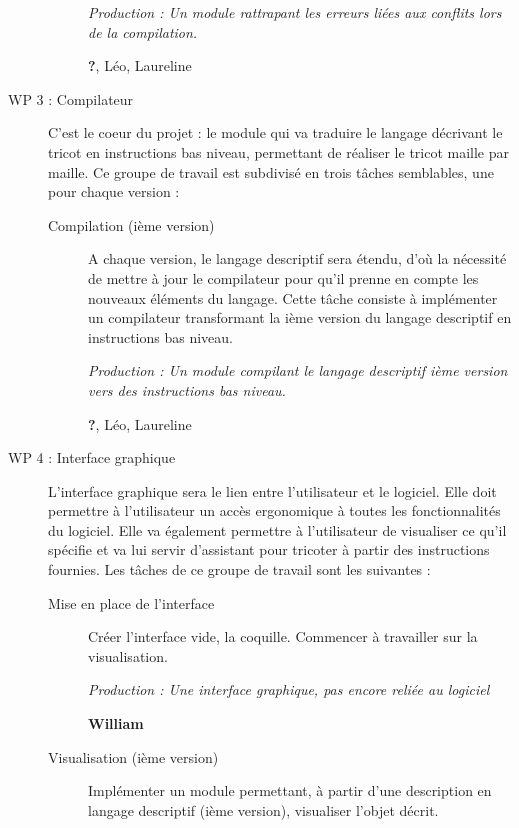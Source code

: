 \documentclass{article}
\begin{document}
\begin{description}
\begin{description}
      \textit{Production : Un module rattrapant les erreurs liées aux conflits lors de la compilation.}

      \textbf{?}, Léo, Laureline

    \end{description}

\medskip

\item[WP 3 : Compilateur] C'est le coeur du projet : le module qui va traduire le langage décrivant le tricot en instructions 
bas niveau, permettant de réaliser le tricot maille par maille. Ce groupe de travail est subdivisé en trois tâches semblables, une pour 
chaque version :

    \begin{description}
    \item[Compilation (ième version)] A chaque version, le langage descriptif sera étendu, d'où la nécessité de mettre à jour le 
compilateur pour qu'il prenne en compte les nouveaux éléments du langage. Cette tâche consiste à implémenter un compilateur transformant 
la ième version du langage descriptif en instructions bas niveau.

      \textit{Production : Un module compilant le langage descriptif ième version vers des instructions bas niveau.}

      \textbf{?}, Léo, Laureline %
    \end{description}

\medskip

\item[WP 4 : Interface graphique] L'interface graphique sera le lien entre l'utilisateur et le logiciel. Elle doit permettre à 
l'utilisateur un accès ergonomique à toutes les fonctionnalités du logiciel. Elle va également permettre à l'utilisateur de visualiser ce 
qu'il spécifie et va lui servir d'assistant pour tricoter à partir des instructions fournies. Les tâches de ce groupe de travail sont les 
suivantes :

  \begin{description}
  \item[Mise en place de l'interface] Créer l'interface vide, la coquille. Commencer à travailler sur la visualisation.

    \textit{Production : Une interface graphique, pas encore reliée au logiciel}

    \textbf{William}
	
  \item[Visualisation (ième version)] Implémenter un module permettant, à partir d'une description en langage descriptif (ième version), 
visualiser l'objet décrit. %


\end{description}
\end{description}
\end{document}
